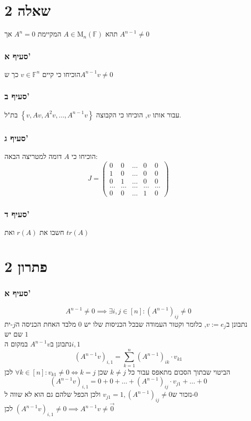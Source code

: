 \documentclass[12pt, titlepage]{article}
\begin{document}
\part*{שאלה 2}
תהא $A\in \mathrm{M}_n\left(\mathbb{F}\right)$ המקיימת $A^{n}=0$ אך $A^{n-1} \neq 0$
\section*{סעיף א'}
הוכיחו כי קיים $v\in\mathbb{F}^n$ כך ש$A^{n-1}v\neq 0$
\section*{סעיף ב'}
עבור אותו $v$, הוכיחו כי הקבוצה $\left\{v,Av,A^2v,\ldots,A^{n-1}v\right\}$ בת"ל.
\section*{סעיף ג'}
הוכיחו כי $A$ דומה למטריצה הבאה:
\[
    J=\begin{pmatrix}
        0 & 0 & \ldots & 0 & 0 \\
        1 & 0 & \ldots & 0 & 0 \\
        0 & 1 & \ldots & 0 & 0 \\
        \ldots & \ldots & \ldots & \ldots & \ldots \\
        0 & 0 & \ldots & 1 & 0
    \end{pmatrix}
\]
\section*{סעיף ד'}
חשבו את $r\left(A\right)$ ואת $tr\left(A\right)$
\newpage
\part*{פתרון 2}
\section*{סעיף א'}
\[
    A^{n-1} \neq 0 \implies \exists i,j \in \left[n\right]: \left(A^{n-1}\right)_{ij} \neq 0
\]
נתבונן ב$v:=e_j$, כלומר וקטור העמודה שבכל הכניסות שלו יש $0$ מלבד האחת הכניסה ה$j$-ית שם יש $1$\\
נתבונן ב$A^{n-1}v$ במקום ה$i,1$
\[
    \left(A^{n-1}v\right)_{i,1} = \sum_{k=1}^{n} \left(A^{n-1}\right)_{ik} \cdot v_{k1}
\]
הביטוי שבתוך הסכום מתאפס עבור כל $k\neq j$ שכן $\forall k \in \left[n\right]: v_{k1} \neq 0 \iff k=j$ לכן
\[
    \left(A^{n-1}v\right)_{i,1} = 0 + 0 + \ldots + \left(A^{n-1}\right)_{ij} \cdot v_{j1} + \ldots + 0
\]
נזכור ש$v_{j1} = 1, \left(A^{n-1}\right)_{ij} \neq 0$ ולכן הכפל שלהם גם הוא לא שווה ל-$0$ \\
לכן $\left(A^{n-1}v\right)_{i,1}\neq 0 \implies A^{n-1}v \neq \vec{0}$\\
\blacksquare
\end{document}
